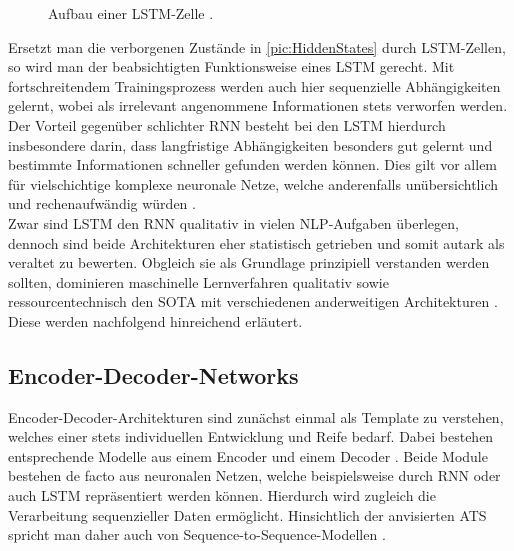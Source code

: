 \begin{figure}[h!]
  \centering
  \caption{Aufbau einer LSTM-Zelle \cite[S.~357]{ZHA20}.}
  \label{pic:LstmCell}
\end{figure}

\noindent
Ersetzt man die verborgenen Zustände in \autoref{pic:HiddenStates} durch \ac{LSTM}-Zellen, so wird man der beabsichtigten Funktionsweise eines \ac{LSTM} gerecht. Mit fortschreitendem Trainingsprozess werden auch hier sequenzielle Abhängigkeiten gelernt, wobei als irrelevant angenommene Informationen stets verworfen werden. Der Vorteil gegenüber schlichter \ac{RNN} besteht bei den \ac{LSTM} hierdurch insbesondere darin, dass langfristige Abhängigkeiten besonders gut gelernt und bestimmte Informationen schneller gefunden werden können. Dies gilt vor allem für vielschichtige komplexe neuronale Netze, welche anderenfalls unübersichtlich und rechenaufwändig würden \cite{LUB18}.\\

\noindent
Zwar sind \ac{LSTM} den \ac{RNN} qualitativ in vielen \ac{NLP}-Aufgaben überlegen, dennoch sind beide Architekturen eher statistisch getrieben und somit autark als veraltet zu bewerten. Obgleich sie als Grundlage prinzipiell verstanden werden sollten, dominieren maschinelle Lernverfahren qualitativ sowie ressourcentechnisch den \ac{SOTA} mit verschiedenen anderweitigen Architekturen \cite{CUR18}. Diese werden nachfolgend hinreichend erläutert.


\subsection{Encoder-Decoder-Networks}
\noindent
Encoder-Decoder-Architekturen sind zunächst einmal als Template zu verstehen, welches einer stets individuellen Entwicklung und Reife bedarf. Dabei bestehen entsprechende Modelle aus einem Encoder und einem Decoder \cite[S.~375-376]{ZHA20}. Beide Module bestehen de facto aus neuronalen Netzen, welche beispielsweise durch \ac{RNN} oder auch \ac{LSTM} repräsentiert werden können. Hierdurch wird zugleich die Verarbeitung sequenzieller Daten ermöglicht. Hinsichtlich der anvisierten \ac{ATS} spricht man daher auch von Sequence-to-Sequence-Modellen \cite[S.~377]{ZHA20}.\\

